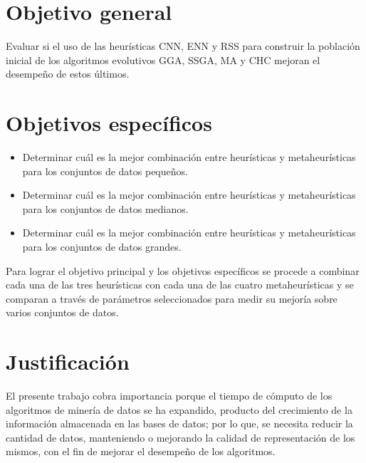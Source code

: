 
\section{Objetivo general}

Evaluar si el uso de las heurísticas CNN, ENN y RSS para construir la población inicial de los algoritmos evolutivos GGA, SSGA, MA y CHC  mejoran el desempeño de estos últimos. 

\section{Objetivos específicos}

\begin{itemize}

\item Determinar cuál es la mejor combinación entre heurísticas y metaheurísticas para los conjuntos de datos pequeños.

\item Determinar cuál es la mejor combinación entre heurísticas y metaheurísticas para los conjuntos de datos medianos.

\item Determinar cuál es la mejor combinación entre heurísticas y metaheurísticas para los conjuntos de datos grandes.

\end{itemize}

Para lograr el objetivo principal y los objetivos específicos se procede a combinar cada una de las tres heurísticas con cada una de las cuatro metaheurísticas y se comparan a través de parámetros seleccionados para medir su mejoría sobre varios conjuntos de datos. 

\section{Justificación}

El presente trabajo cobra importancia porque el tiempo de cómputo de los algoritmos de minería de datos se ha expandido, producto del crecimiento de la información almacenada en las bases de datos; por lo que, se necesita reducir la cantidad de datos, manteniendo o mejorando la calidad de representación de los mismos, con el fin de mejorar el desempeño de los algoritmos.

